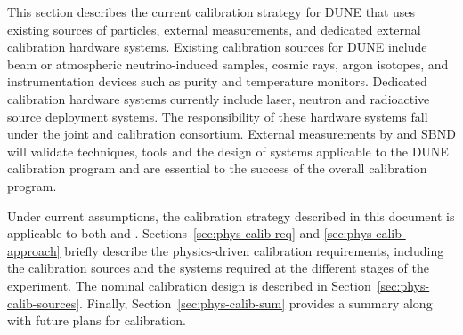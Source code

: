 This section describes the current calibration strategy for DUNE that uses existing sources of particles, external measurements, and dedicated external calibration hardware systems. Existing calibration sources for DUNE include beam or atmospheric neutrino-induced samples, cosmic rays, argon isotopes, and instrumentation devices such as \lar purity and temperature monitors. Dedicated calibration hardware systems currently include laser, neutron and radioactive source deployment systems. The responsibility of these hardware systems fall under the joint  and  calibration consortium. External measurements by  and SBND  will validate techniques, tools and the design of systems applicable to the DUNE calibration program and are essential to the success of the overall calibration program. 

Under current assumptions, the calibration strategy described in this document is applicable to both  and . Sections~\ref{sec:phys-calib-req} and \ref{sec:phys-calib-approach} briefly describe the physics-driven calibration requirements, including the calibration sources and the systems required at the different stages of the experiment. The nominal   calibration design is described in Section~\ref{sec:phys-calib-sources}. Finally, Section~\ref{sec:phys-calib-sum} provides a summary along with future plans for calibration.



